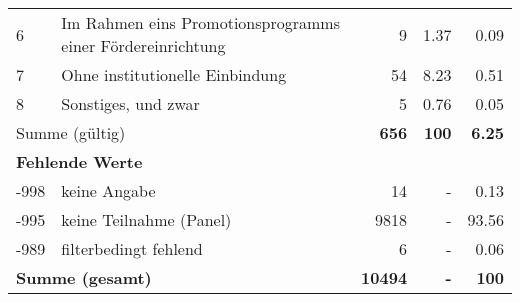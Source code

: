 \begin{longtable}{lXrrr}
     6 &
     \multicolumn{1}{X}{ Im Rahmen eins Promotionsprogramms einer Fördereinrichtung   } &


       \num{9} &
       \num[round-mode=places,round-precision=2]{1.37} &
         \num[round-mode=places,round-precision=2]{0.09} \\

     7 &
     \multicolumn{1}{X}{ Ohne institutionelle Einbindung   } &


       \num{54} &
       \num[round-mode=places,round-precision=2]{8.23} &
         \num[round-mode=places,round-precision=2]{0.51} \\

     8 &
     \multicolumn{1}{X}{ Sonstiges, und zwar   } &


       \num{5} &
       \num[round-mode=places,round-precision=2]{0.76} &
         \num[round-mode=places,round-precision=2]{0.05} \\
     \midrule
     \multicolumn{2}{l}{Summe (gültig)} &
       \textbf{\num{656}} &
     \textbf{\num{100}} &
       \textbf{\num[round-mode=places,round-precision=2]{6.25}} \\
     \multicolumn{5}{l}{\textbf{Fehlende Werte}}\\
       -998 &
       keine Angabe &
         \num{14} &
        - &
         \num[round-mode=places,round-precision=2]{0.13} \\
       -995 &
       keine Teilnahme (Panel) &
         \num{9818} &
        - &
         \num[round-mode=places,round-precision=2]{93.56} \\
       -989 &
       filterbedingt fehlend &
         \num{6} &
        - &
         \num[round-mode=places,round-precision=2]{0.06} \\
     \midrule
     \multicolumn{2}{l}{\textbf{Summe (gesamt)}} &
          \textbf{\num{10494}} &
        \textbf{-} &
        \textbf{\num{100}} \\
     \bottomrule
     \end{longtable}
     
